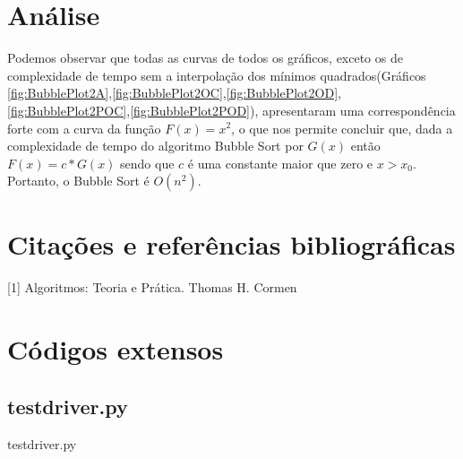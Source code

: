 \documentclass[12pt,a4paper,twoside]{report}
\begin{document}
\chapter{Análise}

Podemos observar que todas as curvas de todos os gráficos, exceto os de complexidade de tempo sem a interpolação dos mínimos quadrados(Gráficos \ref{fig:BubblePlot2A},\ref{fig:BubblePlot2OC},\ref{fig:BubblePlot2OD},\ref{fig:BubblePlot2POC},\ref{fig:BubblePlot2POD}), apresentaram uma correspondência forte com a curva da função $F(x) = x^2$, o que nos permite concluir que, dada a complexidade de tempo do algoritmo Bubble Sort por $G(x)$ então $F(x) = c * G(x)$ sendo que $c$ é uma constante maior que zero e $x > x_0$. Portanto, o Bubble Sort é $O(n^2)$.

\chapter{Citações e referências bibliográficas}

	
	[1] Algoritmos: Teoria e Prática. Thomas H. Cormen
	\date{Today}
	






\clearpage
{}
\appendix

\chapter{Códigos extensos \label{ap:testdriver}}
\section{testdriver.py}
 {testdriver.py}
\end{document}
